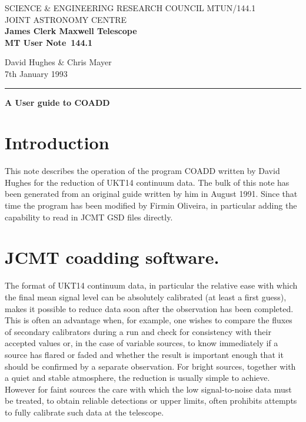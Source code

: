 \documentclass{article}
\newcommand{\jachdoccategory}  {MT User Note}
\newcommand{\jachdocinitials}  {MTUN}
\newcommand{\jachdocnumber}    {144.1}
\newcommand{\jachdocauthors}   {David Hughes \& Chris Mayer}
\newcommand{\jachdocdate}      {7th January 1993}
\newcommand{\jachdoctitle}     {A User guide to COADD}
\newcommand{\jachdocname}{\jachdocinitials /\jachdocnumber}
\begin{document}
\thispagestyle{empty}
SCIENCE \& ENGINEERING RESEARCH COUNCIL \hfill \jachdocname\\
JOINT ASTRONOMY CENTRE\\
{\large\bf James Clerk Maxwell Telescope\\}
{\large\bf \jachdoccategory\ \jachdocnumber}
\begin{flushright}
\jachdocauthors\\
\jachdocdate
\end{flushright}
\vspace{-4mm}
\rule{\textwidth}{0.5mm}
\vspace{5mm}
\begin{center}
{\Large\bf \jachdoctitle}
\end{center}
\vspace{5mm}



\section{Introduction}

  This note describes the operation of the program COADD written by David
Hughes for the reduction of UKT14 continuum data. The bulk of this note has
been generated from an original guide written by him in August 1991. Since
that time the program has been modified by Firmin Oliveira, in particular
adding the capability to read in JCMT GSD files directly.

\section{JCMT coadding software.}

The format of UKT14 continuum data, in particular the relative ease with which
the final mean signal level can be absolutely calibrated (at least a first
guess), makes it possible to
reduce data soon after the observation has been completed. This is often an
advantage when, for example, one wishes to compare the fluxes of secondary
calibrators during
a run and check for consistency with their accepted values or, in the case of
variable sources, to know immediately if a source has flared or faded and
whether the result is important enough that it should be confirmed by a
separate observation. For bright sources, together with a quiet and stable
atmosphere, the reduction is usually simple to achieve.
However for faint sources the care with which the low signal-to-noise
data must be
treated, to obtain reliable detections or upper limits, often prohibits attempts
to fully calibrate such data at the telescope.
\end{document}
